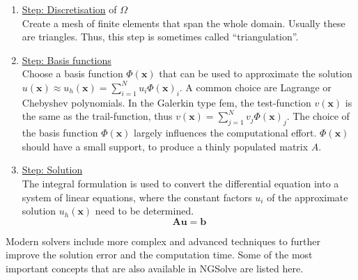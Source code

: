 \documentclass[./\jobname.tex]{subfiles}
\begin{document}
\begin{enumerate}
	\item \underline{Step: Discretisation} of $\Omega$ \\
		  Create a mesh of finite elements that span the whole domain. Usually these are triangles. Thus, this step is sometimes called ``triangulation''.
	\item \underline{Step: Basis functions} \\
		  Choose a basis function $\Phi(\mathbf{x})$ that can be used to approximate the solution $u(\mathbf{x}) \approx u_{h}(\mathbf{x}) = \sum_{i = 1}^{N} u_i \Phi(\mathbf{x})_i$. A common choice are Lagrange or Chebyshev polynomials. In the Galerkin type \gls{fem}, the test-function $v(\mathbf{x})$ is the same as the trail-function, thus $v(\mathbf{x}) = \sum_{j = 1}^{N} v_j \Phi(\mathbf{x})_j$. The choice of the basis function $\Phi(\mathbf{x})$ largely influences the computational effort.  $\Phi(\mathbf{x})$ should have a small support, to produce a thinly populated matrix $A$.
	\item \underline{Step: Solution} \\
		  The integral formulation is used to convert the differential equation into a system of linear equations, where the constant factors $u_i$ of the approximate solution $u_h(\mathbf{x})$ need to be determined. 
		  \begin{equation}
		  \label{eq:linear_system_of_equations}
		  \mathbf{A} \mathbf{u} = \mathbf{b}
		  \end{equation}
\end{enumerate}

Modern solvers include more complex and advanced techniques to further improve the solution error and the computation time. Some of the most important concepts that are also available in NGSolve are listed here. 
\end{document}
